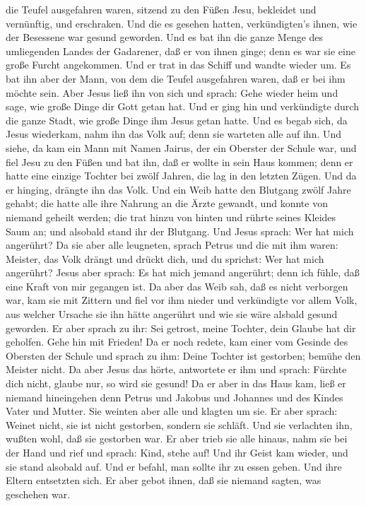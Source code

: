 die Teufel ausgefahren waren, sitzend zu den Füßen Jesu, bekleidet und
vernünftig, und erschraken.  Und die es gesehen hatten,
verkündigten's ihnen, wie der Besessene war gesund geworden.
 Und es bat ihn die ganze Menge des umliegenden Landes der
Gadarener, daß er von ihnen ginge; denn es war sie eine große Furcht
angekommen. Und er trat in das Schiff und wandte wieder um.
 Es bat ihn aber der Mann, von dem die Teufel ausgefahren
waren, daß er bei ihm möchte sein. Aber Jesus ließ ihn von sich und
sprach:  Gehe wieder heim und sage, wie große Dinge dir
Gott getan hat. Und er ging hin und verkündigte durch die ganze Stadt,
wie große Dinge ihm Jesus getan hatte.  Und es begab sich,
da Jesus wiederkam, nahm ihn das Volk auf; denn sie warteten alle auf
ihn.  Und siehe, da kam ein Mann mit Namen Jairus, der ein
Oberster der Schule war, und fiel Jesu zu den Füßen und bat ihn, daß er
wollte in sein Haus kommen;  denn er hatte eine einzige
Tochter bei zwölf Jahren, die lag in den letzten Zügen. Und da er
hinging, drängte ihn das Volk.  Und ein Weib hatte den
Blutgang zwölf Jahre gehabt; die hatte alle ihre Nahrung an die Ärzte
gewandt, und konnte von niemand geheilt werden;  die trat
hinzu von hinten und rührte seines Kleides Saum an; und alsobald stand
ihr der Blutgang.  Und Jesus sprach: Wer hat mich
angerührt? Da sie aber alle leugneten, sprach Petrus und die mit ihm
waren: Meister, das Volk drängt und drückt dich, und du sprichst: Wer
hat mich angerührt?  Jesus aber sprach: Es hat mich jemand
angerührt; denn ich fühle, daß eine Kraft von mir gegangen ist.
 Da aber das Weib sah, daß es nicht verborgen war, kam sie
mit Zittern und fiel vor ihm nieder und verkündigte vor allem Volk, aus
welcher Ursache sie ihn hätte angerührt und wie sie wäre alsbald gesund
geworden.  Er aber sprach zu ihr: Sei getrost, meine
Tochter, dein Glaube hat dir geholfen. Gehe hin mit Frieden!
 Da er noch redete, kam einer vom Gesinde des Obersten der
Schule und sprach zu ihm: Deine Tochter ist gestorben; bemühe den
Meister nicht.  Da aber Jesus das hörte, antwortete er ihm
und sprach: Fürchte dich nicht, glaube nur, so wird sie gesund!
 Da er aber in das Haus kam, ließ er niemand hineingehen
denn Petrus und Jakobus und Johannes und des Kindes Vater und Mutter.
 Sie weinten aber alle und klagten um sie. Er aber sprach:
Weinet nicht, sie ist nicht gestorben, sondern sie schläft.
 Und sie verlachten ihn, wußten wohl, daß sie gestorben
war.  Er aber trieb sie alle hinaus, nahm sie bei der Hand
und rief und sprach: Kind, stehe auf!  Und ihr Geist kam
wieder, und sie stand alsobald auf. Und er befahl, man sollte ihr zu
essen geben.  Und ihre Eltern entsetzten sich. Er aber
gebot ihnen, daß sie niemand sagten, was geschehen war.

